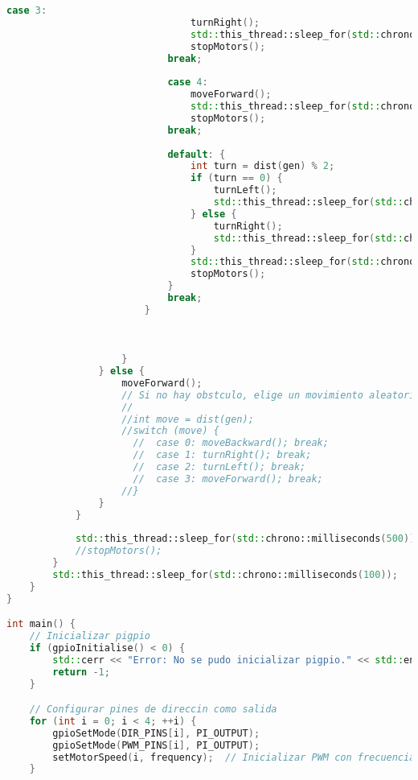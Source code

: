 \begin{lstlisting}[language={C++}, caption={Tercer ajuste de c\'odigo}, label={TercerAjuste}]
                            case 3:
                                turnRight();
                                std::this_thread::sleep_for(std::chrono::seconds(7));
                                stopMotors();
                            break;
                            
                            case 4:
                                moveForward();
                                std::this_thread::sleep_for(std::chrono::seconds(2));
                                stopMotors();
                            break;
                            
                            default: {
                                int turn = dist(gen) % 2;
                                if (turn == 0) {
                                    turnLeft();
                                    std::this_thread::sleep_for(std::chrono::seconds(5));
                                } else {
                                    turnRight();
                                    std::this_thread::sleep_for(std::chrono::seconds(5));
                                }
                                std::this_thread::sleep_for(std::chrono::seconds(2));
                                stopMotors();
                            }
                            break;
                        }

                        
                        
                    }
                } else {
                    moveForward();
                    // Si no hay obstculo, elige un movimiento aleatorio
                    //
                    //int move = dist(gen);
                    //switch (move) {
                      //  case 0: moveBackward(); break;
                      //  case 1: turnRight(); break;
                      //  case 2: turnLeft(); break;
                      //  case 3: moveForward(); break;
                    //}
                }
            }
            
            std::this_thread::sleep_for(std::chrono::milliseconds(500));
            //stopMotors();
        }
        std::this_thread::sleep_for(std::chrono::milliseconds(100));
    }
}

int main() {
    // Inicializar pigpio
    if (gpioInitialise() < 0) {
        std::cerr << "Error: No se pudo inicializar pigpio." << std::endl;
        return -1;
    }

    // Configurar pines de direccin como salida
    for (int i = 0; i < 4; ++i) {
        gpioSetMode(DIR_PINS[i], PI_OUTPUT);
        gpioSetMode(PWM_PINS[i], PI_OUTPUT);
        setMotorSpeed(i, frequency);  // Inicializar PWM con frecuencia inicial
    }


\end{lstlisting}
